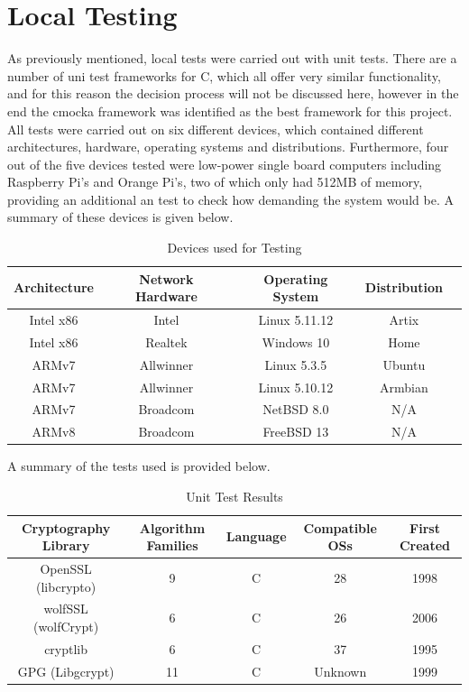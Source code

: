 \documentclass[a4paper, 11pt]{report}
\begin{document}
\section{Local Testing}
As previously mentioned, local tests were carried out with unit tests. There are a number of uni test frameworks for C, which all offer very similar functionality, and for this reason the decision process will not be discussed here, however in the end the cmocka\cite{cmocka} framework was identified as the best framework for this project. All tests were carried out on six different devices, which contained different architectures, hardware, operating systems and distributions. Furthermore, four out of the five devices tested were low-power single board computers including Raspberry Pi's and Orange Pi's, two of which only had 512MB of memory, providing an additional an test to check how demanding the system would be. A summary of these devices is given below.

\begin{table}[H]
\centering
\begin{tabular}{ |c|c|c|c|c| } 
\hline
Architecture & Network Hardware & Operating System & Distribution\\
\hline
Intel x86 & Intel & Linux 5.11.12 & Artix\\
Intel x86 & Realtek & Windows 10 & Home\\
ARMv7 & Allwinner & Linux 5.3.5 & Ubuntu\\
ARMv7 & Allwinner & Linux 5.10.12 & Armbian\\
ARMv7 & Broadcom & NetBSD 8.0 & N/A\\
ARMv8 & Broadcom & FreeBSD 13 & N/A\\
\hline
\end{tabular}
\caption{Devices used for Testing}
\label{tab:testdevices}
\end{table}

A summary of the tests used is provided below.

\begin{table}[H]
\centering
\begin{tabular}{ |c|c|c|c|c| } 
\hline
Cryptography Library & Algorithm Families & Language & Compatible OSs & First Created\\
\hline
OpenSSL (libcrypto)\cite{libcrypto} & 9 & C & 28 & 1998\\
wolfSSL (wolfCrypt)\cite{wolfCrypt} & 6 & C & 26 & 2006\\
cryptlib\cite{cryptlib} & 6 & C & 37 & 1995\\
GPG (Libgcrypt)\cite{libgcrypt} & 11 & C & Unknown & 1999\\
\hline
\end{tabular}
\caption{Unit Test Results}
\label{tab:unittests}
\end{table}
\end{document}
